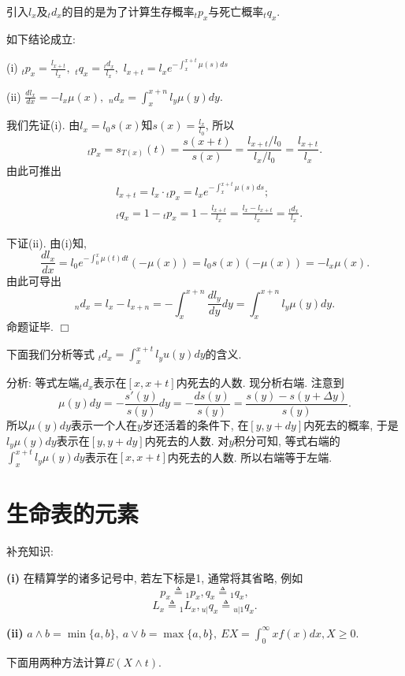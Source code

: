 \documentclass[a4paper,openany, 10pt]{ctexbook}
\def\qed{\hfill$\Box$\medskip}
\begin{document}
引入$l_x$及${}_td_x$的目的是为了计算生存概率${}_tp_x$与死亡概率${}_tq_x.$
\begin{proposition}\label{prop1.8}如下结论成立:

    (i) ${}_tp_x=\frac{l_{x+t}}{l_x},$  ${}_tq_x=\frac{{}_td_x}{l_x},$  $l_{x+t}=l_xe^{-\int_{x}^{x+t}\mu(s)ds}$

    (ii) $\frac{dl_x}{dx}=-l_x\mu(x),$ $_nd_x=\int_{x}^{x+n}l_y\mu(y)dy.$
\end{proposition}

\proof 我们先证(i). 由$l_x=l_0s(x)$知$s(x)=\frac{l_x}{l_0}$, 所以
$$_tp_x=s_{T(x)}(t)=\frac{s(x+t)}{s(x)}=\frac{l_{x+t}/l_0}{l_x/l_0}=\frac{l_{x+t}}{l_x}.$$
由此可推出\begin{align*}
     & l_{x+t}=l_x\cdot{}_tp_x=l_xe^{-\int_{x}^{x+t}\mu(s)ds};                          \\
     & {}_tq_x=1-{}_tp_x=1-\frac{l_{x+t}}{l_x}=\frac{l_x-l_{x+t}}{l_x}=\frac{_td_x}{l_x}.
\end{align*}

下证(ii). 由(i)知,
$$\frac{dl_x}{dx}=l_0e^{-\int_{0}^{x}\mu(t)dt}(-\mu(x))=l_0s(x)(-\mu(x))=-l_x\mu(x).$$
由此可导出
$${}_nd_x=l_x-l_{x+n}=-\int_{x}^{x+n}\frac{dl_y}{dy}dy=\int_{x}^{x+n}l_y\mu(y)dy.$$
命题证毕.
\qed

\begin{remark} 下面我们分析等式
  ${}_td_x=\int_x^{x+t} l_yu(y)dy$的含义.

分析: 等式左端${}_td_x$表示在$[x,x+t]$内死去的人数. 现分析右端. 注意到$$\mu(y)dy=-\dfrac{s'(y)}{s(y)}dy=-\dfrac{ds(y)}{s(y)}=\dfrac{s(y)-s(y+\Delta y)}{s(y)}.$$ 所以$\mu(y)dy$表示一个人在$y$岁还活着的条件下, 在$[y,y+dy]$内死去的概率, 于是$l_y\mu(y)dy$表示在$[y,y+dy]$内死去的人数. 对$y$积分可知, 等式右端的$\int_x^{x+t}l_y\mu(y)dy$表示在$[x,x+t]$内死去的人数. 所以右端等于左端.
\end{remark}

\section{生命表的元素}
补充知识:

{\rm\bf(i)} 在精算学的诸多记号中, 若左下标是1, 通常将其省略, 例如
$${p_x}\triangleq{}_1p_x,{q_x}\triangleq{}_1q_x,$$
$$L_x\triangleq{}_1L_x,{}_{u|}q_x\triangleq{}_{u|1}q_x.$$

{\rm\bf(ii)} $a\wedge b=\min\{a,b\},\ a\vee b=\max\{a,b\},\ EX=\int_0^{\infty}xf(x)dx,X\ge0.$

下面用两种方法计算$E(X\wedge t).$
\end{document}
